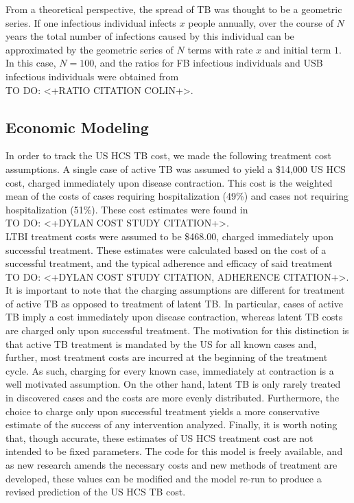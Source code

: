 \documentclass{amsart}
\newcommand{\TODO}[1]{\hfill\\{\huge \color{red} TO DO:} #1 \hfill \\}
\begin{document}
From a theoretical perspective, the spread of TB was thought to be a geometric
series. If one infectious individual infects $x$ people annually, over the
course of $N$ years the total number of infections caused by this individual can
be approximated by the geometric series of $N$ terms with rate $x$ and initial
term $1$. In this case, $N = 100$, and the ratios for FB infectious individuals
and USB infectious individuals were obtained from 
\TODO{<+RATIO CITATION COLIN+>.}
\subsection{Economic Modeling}
In order to track the US HCS TB cost, we made the following treatment cost
assumptions. A single case of active TB was assumed to yield a \$14,000 US HCS
cost, charged immediately upon disease contraction. This cost is the weighted
mean of the costs of cases requiring hospitalization (49\%) and cases not
requiring hospitalization (51\%).  These cost estimates were found in 
\TODO{<+DYLAN COST STUDY CITATION+>.} LTBI treatment costs were assumed to be
\$468.00, charged immediately upon successful treatment. These estimates were
calculated based on the cost of a successful treatment, and the typical
adherence and efficacy of said treatment 
\TODO{<+DYLAN COST STUDY CITATION, ADHERENCE CITATION+>.}
It is important to note that the charging assumptions are different for
treatment of active TB as opposed to treatment of latent TB. In particular,
cases of active TB imply a cost immediately upon disease contraction, whereas
latent TB costs are charged only upon successful treatment. The motivation for
this distinction is that active TB treatment is mandated by the US for all known
cases and, further, most treatment costs are incurred at the beginning of the
treatment cycle. As such, charging for every known case, immediately at
contraction is a well motivated assumption. On the other hand, latent TB is only
rarely treated in discovered cases and the costs are more evenly distributed.
Furthermore, the choice to charge only upon successful treatment yields a more
conservative estimate of the success of any intervention analyzed. Finally, it
is worth noting that, though accurate, these estimates of US HCS treatment cost
are not intended to be fixed parameters. The code for this model is freely
available, and as new research amends the necessary costs and new methods of
treatment are developed, these values can be modified and the model re-run to
produce a revised prediction of the US HCS TB cost. 
\end{document}
